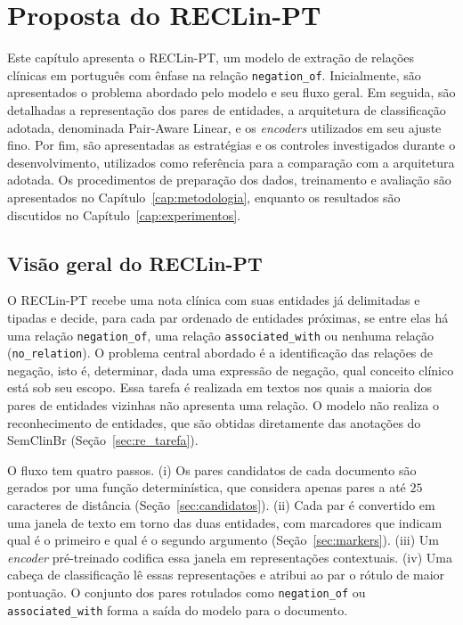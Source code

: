 \chapter[Proposta do RECLin-PT]{Proposta do RECLin-PT}
\label{cap:prototipo}

Este capítulo apresenta o RECLin-PT, um modelo de extração de relações clínicas em português com ênfase na relação \texttt{negation\_of}. Inicialmente, são apresentados o problema abordado pelo modelo e seu fluxo geral. Em seguida, são detalhadas a representação dos pares de entidades, a arquitetura de classificação adotada, denominada Pair-Aware Linear, e os \emph{encoders} utilizados em seu ajuste fino. Por fim, são apresentadas as estratégias e os controles investigados durante o desenvolvimento, utilizados como referência para a comparação com a arquitetura adotada. Os procedimentos de preparação dos dados, treinamento e avaliação são apresentados no Capítulo~\ref{cap:metodologia}, enquanto os resultados são discutidos no Capítulo~\ref{cap:experimentos}.

\section{Visão geral do RECLin-PT}
\label{sec:visao_reclin}

O RECLin-PT recebe uma nota clínica com suas entidades já delimitadas e tipadas e
decide, para cada par ordenado de entidades próximas, se entre elas há uma relação
\texttt{negation\_of}, uma relação \texttt{associated\_with} ou nenhuma relação
(\texttt{no\_relation}). O problema central abordado é a identificação das relações de negação, isto é, determinar, dada uma expressão de negação, qual conceito clínico está sob seu escopo. Essa tarefa é realizada em textos nos quais a maioria dos pares de entidades vizinhas não apresenta uma relação. O modelo não realiza o reconhecimento de entidades, que são obtidas diretamente das anotações do SemClinBr (Seção~\ref{sec:re_tarefa}).

O fluxo tem quatro passos. (i) Os pares candidatos de cada documento são gerados por
uma função determinística, que considera apenas pares a até $25$ caracteres de
distância (Seção~\ref{sec:candidatos}). (ii) Cada par é convertido em uma janela de
texto em torno das duas entidades, com marcadores que indicam qual é o primeiro e
qual é o segundo argumento (Seção~\ref{sec:markers}). (iii) Um \emph{encoder}
pré-treinado codifica essa janela em representações contextuais. (iv) Uma cabeça de
classificação lê essas representações e atribui ao par o rótulo de maior pontuação.
O conjunto dos pares rotulados como \texttt{negation\_of} ou \texttt{associated\_with}
forma a saída do modelo para o documento.


